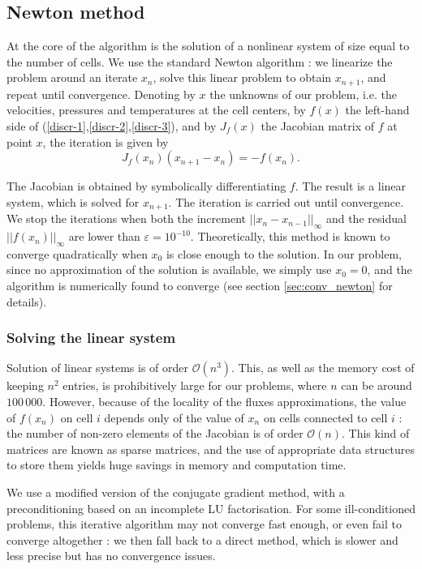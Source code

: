\documentclass[12pt]{article}
\begin{document}
\subsection{Newton method}
At the core of the algorithm is the solution of a nonlinear system of
size equal to the number of cells. We use the standard Newton
algorithm : we linearize the problem around an iterate $x_n$, solve
this linear problem to obtain $x_{n+1}$, and repeat until
convergence. Denoting by $x$ the unknowns of our problem, i.e. the
velocities, pressures and temperatures at the cell centers, by $f(x)$
the left-hand side of (\ref{discr-1},\ref{discr-2},\ref{discr-3}), and
by $J_f(x)$ the Jacobian matrix of $f$ at point $x$, the iteration is
given by
\begin{equation}
  \label{eq:newton}
  J_f(x_n) (x_{n+1} - x_n) = - f(x_n).
\end{equation}

The Jacobian is obtained by symbolically differentiating $f$. The
result is a linear system, which is solved for $x_{n+1}$. The iteration
is carried out until convergence. We stop the iterations when both the
increment $||x_{n} - x_{n-1}||_\infty$ and the residual
$||f(x_n)||_\infty$ are lower than $\varepsilon =
10^{-10}$. Theoretically, this method is known to converge
quadratically when $x_0$ is close enough to the solution. In our problem,
since no approximation of the solution is available, we simply use
$x_0 = 0$, and the algorithm is numerically found to converge (see
section \ref{sec:conv_newton} for details).

\subsubsection{Solving the linear system}
Solution of linear systems is of order $\mathcal O (n^3)$. This, as
well as the memory cost of keeping $n^2$ entries, is prohibitively
large for our problems, where $n$ can be around $100\,000$. However,
because of the locality of the fluxes approximations, the value of
$f(x_n)$ on cell $i$ depends only of the value of $x_n$ on cells
connected to cell $i$ : the number of non-zero elements of the
Jacobian is of order $\mathcal O (n)$. This kind of matrices are known
as sparse matrices, and the use of appropriate data structures to
store them yields huge savings in memory and computation time.

We use a modified version of the conjugate gradient method, with a
preconditioning based on an incomplete LU factorisation. For some
ill-conditioned problems, this iterative algorithm may not converge
fast enough, or even fail to converge altogether : we then fall back
to a direct method, which is slower and less precise but has no
convergence issues.
\end{document}
